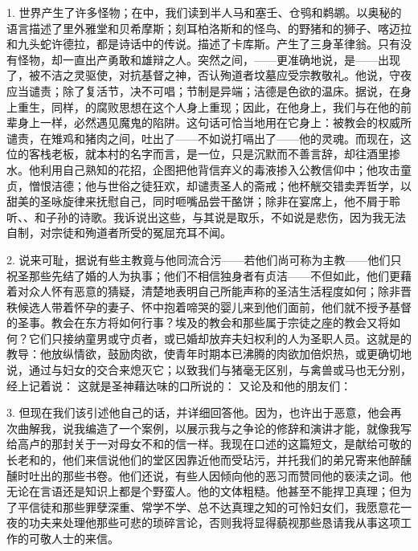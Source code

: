 1. 世界产生了许多怪物；在中，我们读到半人马和塞壬、仓鸮和鹈鹕。以奥秘的语言描述了里外雅堂和贝希摩斯；刻耳柏洛斯和的怪鸟、的野猪和的狮子、喀迈拉和九头蛇许德拉，都是诗话中的传说。描述了卡库斯。产生了三身革律翁。只有没有怪物，却一直出产勇敢和雄辩之人。突然之间，——更准确地说，是——出现了，被不洁之灵驱使，对抗基督之神，否认殉道者坟墓应受宗教敬礼。他说，守夜应当谴责；除了复活节，决不可唱；节制是异端；洁德是色欲的温床。据说，在身上重生，同样，的腐败思想在这个人身上重现；因此，在他身上，我们与在他的前辈身上一样，必然遇见魔鬼的陷阱。这句话可恰当地用在它身上：被教会的权威所谴责，在雉鸡和猪肉之间，吐出了——不如说打嗝出了——他的灵魂。而现在，这位的客栈老板，就本村的名字而言，是一位，只是沉默而不善言辞，却往酒里掺水。他利用自己熟知的花招，企图把他背信弃义的毒液掺入公教信仰中；他攻击童贞，憎恨洁德；他与世俗之徒狂欢，却谴责圣人的斋戒；他杯觥交错卖弄哲学，以甜美的圣咏旋律来抚慰自己，同时咂嘴品尝干酪饼；除非在宴席上，他不屑于聆听、、和子孙的诗歌。我诉说出这些，与其说是取乐，不如说是悲伤，因为我无法自制，对宗徒和殉道者所受的冤屈充耳不闻。\par

2. 说来可耻，据说有些主教竟与他同流合污——若他们尚可称为主教——他们只祝圣那些先结了婚的人为执事；他们不相信独身者有贞洁——不但如此，他们更藉着对众人怀有恶意的猜疑，清楚地表明自己所能声称的圣洁生活程度如何；除非晋秩候选人带着怀孕的妻子、怀中抱着啼哭的婴儿来到他们面前，他们就不授予基督的圣事。教会在东方将如何行事？埃及的教会和那些属于宗徒之座的教会又将如何？它们只接纳童男或守贞者，或已婚却放弃夫妇权利的人为圣职人员。这就是的教导：他放纵情欲，鼓励肉欲，使青年时期本已沸腾的肉欲加倍炽热，或更确切地说，通过与妇女的交合来熄灭它；以致我们与猪毫无区别，与禽兽或马也无分别，经上记着说：  这就是圣神藉达味的口所说的： 又论及和他的朋友们：\par

3. 但现在我们该引述他自己的话，并详细回答他。因为，也许出于恶意，他会再次曲解我，说我编造了一个案例，以展示我与之争论的修辞和演讲才能，就像我写给高卢的那封关于一对母女不和的信一样。我现在口述的这篇短文，是献给可敬的长老和的，他们来信说他们的堂区因靠近他而受玷污，并托我们的弟兄寄来他醉醺醺时吐出的那些书卷。他们还说，有些人因倾向他的恶习而赞同他的亵渎之词。他无论在言语还是知识上都是个野蛮人。他的文体粗糙。他甚至不能捍卫真理；但为了平信徒和那些罪孽深重、常学不学、总不达真理之知的可怜妇女们，我愿意花一夜的功夫来处理他那些可悲的琐碎言论，否则我将显得藐视那些恳请我从事这项工作的可敬人士的来信。\par

